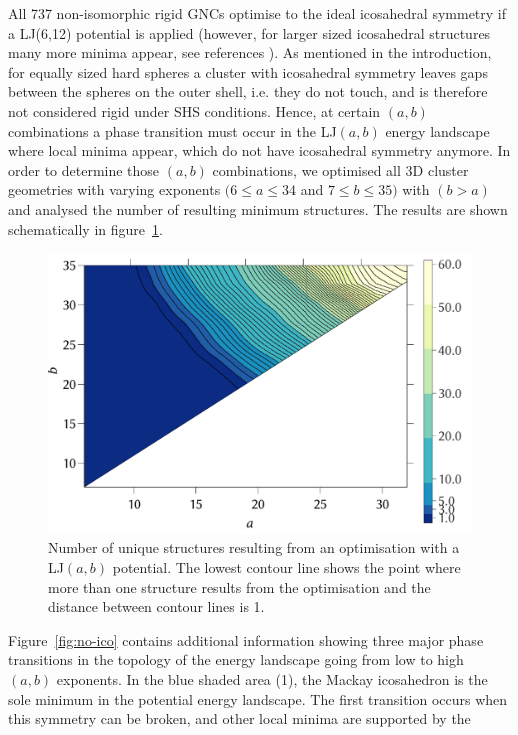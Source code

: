 All 737 non-isomorphic rigid GNCs optimise to the ideal icosahedral symmetry if
a LJ(6,12) potential is applied
\autocite{Trombach_stickyhardsphereLennardJonestypeclusters_2018} (however, for
larger sized icosahedral structures many more minima appear, see references
\cite{Doye-1995,Wales_TheoreticalPredictionsStructure_1996,Doye_effectrangepotential_1996,Doye_Structuralconsequencesrange_1997}).
As mentioned in the introduction, for equally sized hard spheres a cluster with
icosahedral symmetry leaves gaps between the spheres on the outer shell, i.e.
they do not touch, and is therefore not considered rigid under SHS conditions.
Hence, at certain $(a,b)$ combinations a phase transition must occur in the
LJ$(a,b)$ energy landscape where local minima appear, which do not have
icosahedral symmetry anymore. In order to determine those $(a,b)$ combinations,
we optimised all 3D cluster geometries with varying exponents $(6\leq a \leq
34$ and $7\leq b\leq 35)$ with $(b>a)$ and analysed the number of resulting
minimum structures. The results are shown schematically in
figure~\ref{fig:ico-2d}.
%
\begin{figure}[htb]\centering
    \includegraphics[width=.8\columnwidth]{gregory-newton/ico-2d.pdf}
    \caption{Number of unique structures resulting from an optimisation with a
    LJ$(a,b)$ potential. The lowest contour line shows the point where more
    than one structure results from the optimisation and the distance between
    contour lines is 1.}
    \label{fig:ico-2d}
\end{figure}
%
Figure~\ref{fig:no-ico} contains additional information showing three major
phase transitions in the topology of the energy landscape going from low to
high $(a,b)$ exponents. In the blue shaded area (1), the Mackay icosahedron is
the sole minimum in the potential energy landscape. The first transition occurs
when this symmetry can be broken, and other local minima are supported by the

